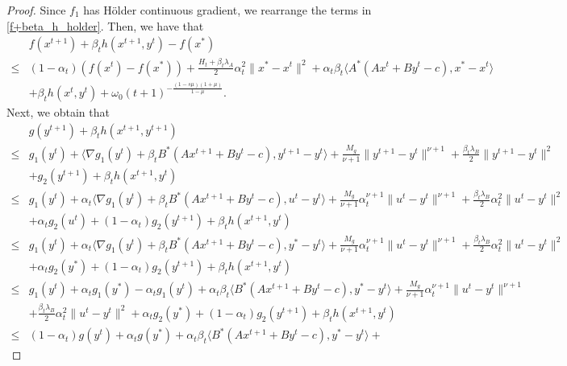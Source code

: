 \documentclass{article}
\numberwithin{equation}{section}
\begin{document}
\begin{proof}
    Since $f_1$ has H\"older continuous gradient, we rearrange the terms in \eqref{f+beta_h_holder}. Then, we have that 
    \begin{align} 
        &f(x^{t+1}) +\beta_th(x^{t+1},y^t) -f(x^*)\nonumber \\
        \leq & (1-\alpha_t)(f(x^t)-f(x^*))+\frac{H_t+\beta_t\lambda_A}{2}\alpha_t^2\|x^*-x^t\rVert^2 +\alpha_t\beta_t\langle A^*(Ax^t+By^t-c), x^*-x^t\rangle \nonumber \\
        &+ \beta_th(x^t,y^t) +\omega_0(t+1)^{-\frac{(1-s\mu)(1+\mu)}{1-\mu}}.  \label{f+beta_h-f*}
    \end{align}
    Next, we obtain that 
    \begin{align}
        &g(y^{t+1}) + \beta_th(x^{t+1},y^{t+1}) \nonumber \\
        \overset{\mathop{(a)}}{\leq}& g_1(y^{t})+ \langle \nabla g_1(y^t)+\beta_tB^*(Ax^{t+1}+By^t-c), y^{t+1}-y^t\rangle + 
        \frac{M_g}{\nu+1}\|y^{t+1}-y^t\rVert^{\nu+1}+\frac{\beta_t\lambda_B}{2}\|y^{t+1}-y^t\rVert^2 \nonumber\\
        &+g_2(y^{t+1}) +\beta_th(x^{t+1},y^t) \nonumber \\
        \overset{\mathop{(b)}}{\leq}& g_1(y^{t})+ \alpha_t\langle \nabla g_1(y^t)+\beta_tB^*(Ax^{t+1}+By^t-c), u^t-y^t\rangle + 
        \frac{M_g}{\nu+1}\alpha_t^{\nu+1}\|u^t-y^t\rVert^{\nu+1}+\frac{\beta_t\lambda_B}{2}\alpha_t^2\|u^t-y^t\rVert^2 \nonumber\\
        &+\alpha_tg_2(u^t)+(1-\alpha_t)g_2(y^{t+1}) +\beta_th(x^{t+1},y^t)\nonumber \\
        \overset{\mathop{(c)}}{\leq}& g_1(y^{t})+ \alpha_t\langle \nabla g_1(y^t)+\beta_tB^*(Ax^{t+1}+By^t-c), y^*-y^t\rangle + 
        \frac{M_g}{\nu+1}\alpha_t^{\nu+1}\|u^t-y^t\rVert^{\nu+1}+\frac{\beta_t\lambda_B}{2}\alpha_t^2\|u^t-y^t\rVert^2 \nonumber\\
        &+\alpha_tg_2(y^*)+(1-\alpha_t)g_2(y^{t+1}) +\beta_th(x^{t+1},y^t) \nonumber \\
        \overset{\mathop{(d)}}{\leq}& g_1(y^{t})+\alpha_tg_1(y^*)-\alpha_tg_1(y^t)+ \alpha_t\beta_t\langle B^*(Ax^{t+1}+By^t-c), y^*-y^t\rangle + 
        \frac{M_g}{\nu+1}\alpha_t^{\nu+1}\|u^t-y^t\rVert^{\nu+1} \nonumber\\
        &+\frac{\beta_t\lambda_B}{2}\alpha_t^2\|u^t-y^t\rVert^2+\alpha_tg_2(y^*)+(1-\alpha_t)g_2(y^{t+1}) +\beta_th(x^{t+1},y^t) \nonumber \\
        \overset{\mathop{(e)}}{\leq}& (1-\alpha_t)g(y^{t})+\alpha_tg(y^*)+ \alpha_t\beta_t\langle B^*(Ax^{t+1}+By^t-c), y^*-y^t\rangle + 

\end{align}
\end{proof}
\end{document}
